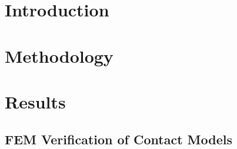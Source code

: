 \documentclass[11pt,a4paper]{article}
\begin{document}




\newpage
{}


\newpage
\begin{spacing}{0.975}
\tableofcontents 
\end{spacing}




\newpage
\section{Introduction}




\newpage
\section{Methodology}





\newpage
\section{Results}

\subsection{FEM Verification of Contact Models }


\newpage
\end{document}

